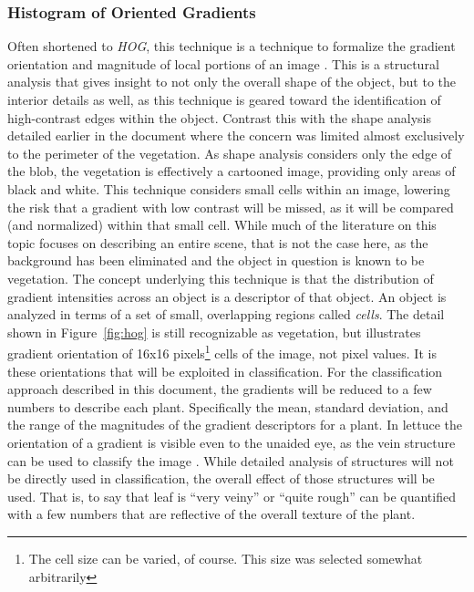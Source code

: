 \documentclass[letterpaper]{article}
\begin{document}
{\subsubsection{Histogram of Oriented Gradients}
Often shortened to \textit{HOG}, this technique is a technique to formalize the gradient orientation and magnitude of local portions of an image \parencite[p.~155]{Forsyth2012-hy}. This is a structural analysis that gives insight to not only the overall shape of the object, but to the interior details as well, as this technique is geared toward the identification of high-contrast edges within the object. Contrast this with the shape analysis detailed earlier in the document where the concern was limited almost exclusively to the perimeter of the vegetation.  As shape analysis considers only the edge of the blob, the vegetation is effectively a cartooned image, providing only areas of black and white. This technique considers small cells within an image, lowering the risk that a gradient with low contrast will be missed, as it will be compared (and normalized) within that small cell. While much of the literature on this topic focuses on describing an entire scene, that is not the case here, as the background has been eliminated and the object in question is known to be vegetation. The concept underlying this technique is that the distribution of gradient intensities across an object is a descriptor of that object. An object is analyzed in terms of a set of small, overlapping regions called \textit{cells}.
The detail shown in Figure~\ref{fig:hog} is still recognizable as vegetation, but illustrates gradient orientation of 16x16 pixels\footnote{The cell size can be varied, of course. This size was selected somewhat arbitrarily} cells of the image, not pixel values. It is these orientations that will be exploited in classification.  For the classification approach described in this document, the gradients will be reduced to a few numbers to describe each plant. Specifically the mean, standard deviation, and the range of the magnitudes of the gradient descriptors for a plant. In lettuce the orientation of a gradient is visible even to the unaided eye, as the vein structure can be used to classify the image \parencite{Elhariri2014-eo}. While detailed analysis of structures will not be directly used in classification, the overall effect of those structures will be used. That is, to say that leaf is ``very veiny'' or ``quite rough'' can be quantified with a few numbers that are reflective of the overall texture of the plant.
\begin{figure}[H]

\end{figure}}
\end{document}
